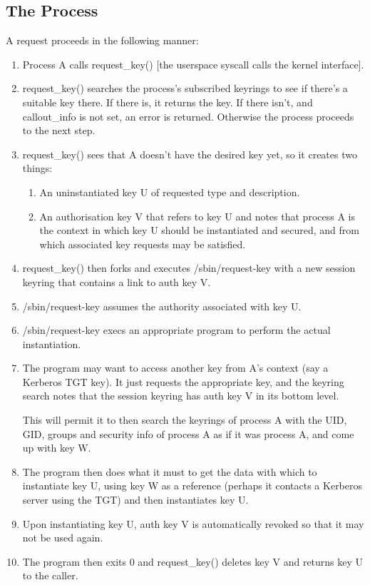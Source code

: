 \documentclass[a4paper,8pt,english]{sphinxmanual}
\begin{document}
\subsection{The Process}
\label{security/keys/request-key:the-process}
A request proceeds in the following manner:
\begin{enumerate}
\item {} 
Process A calls request\_key() {[}the userspace syscall calls the kernel
interface{]}.

\item {} 
request\_key() searches the process's subscribed keyrings to see if there's
a suitable key there.  If there is, it returns the key.  If there isn't,
and callout\_info is not set, an error is returned.  Otherwise the process
proceeds to the next step.

\item {} 
request\_key() sees that A doesn't have the desired key yet, so it creates
two things:
\begin{enumerate}
\item {} 
An uninstantiated key U of requested type and description.

\item {} 
An authorisation key V that refers to key U and notes that process A
is the context in which key U should be instantiated and secured, and
from which associated key requests may be satisfied.

\end{enumerate}

\item {} 
request\_key() then forks and executes /sbin/request-key with a new session
keyring that contains a link to auth key V.

\item {} 
/sbin/request-key assumes the authority associated with key U.

\item {} 
/sbin/request-key execs an appropriate program to perform the actual
instantiation.

\item {} 
The program may want to access another key from A's context (say a
Kerberos TGT key).  It just requests the appropriate key, and the keyring
search notes that the session keyring has auth key V in its bottom level.

This will permit it to then search the keyrings of process A with the
UID, GID, groups and security info of process A as if it was process A,
and come up with key W.

\item {} 
The program then does what it must to get the data with which to
instantiate key U, using key W as a reference (perhaps it contacts a
Kerberos server using the TGT) and then instantiates key U.

\item {} 
Upon instantiating key U, auth key V is automatically revoked so that it
may not be used again.

\item {} 
The program then exits 0 and request\_key() deletes key V and returns key
U to the caller.

\end{enumerate}
\end{document}
